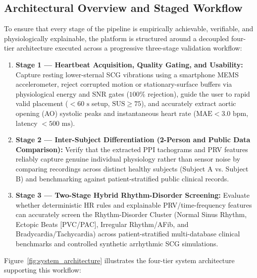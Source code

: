 \subsection{Architectural Overview and Staged Workflow}
To ensure that every stage of the pipeline is empirically achievable, verifiable, and physiologically explainable, the platform is structured around a decoupled four-tier architecture executed across a progressive three-stage validation workflow:
\begin{enumerate}
	\item \textbf{Stage 1 --- Heartbeat Acquisition, Quality Gating, and Usability:} Capture resting lower-sternal SCG vibrations using a smartphone MEMS accelerometer, reject corrupted motion or stationary-surface buffers via physiological energy and SNR gates ($100\%$ rejection), guide the user to rapid valid placement ($< 60\text{ s}$ setup, $\text{SUS} \ge 75$), and accurately extract aortic opening (AO) systolic peaks and instantaneous heart rate ($\text{MAE} < 3.0\text{ bpm}$, latency $< 500\text{ ms}$).
	\item \textbf{Stage 2 --- Inter-Subject Differentiation (2-Person and Public Data Comparison):} Verify that the extracted PPI tachograms and PRV features reliably capture genuine individual physiology rather than sensor noise by comparing recordings across distinct healthy subjects (Subject A vs. Subject B) and benchmarking against patient-stratified public clinical records.
	\item \textbf{Stage 3 --- Two-Stage Hybrid Rhythm-Disorder Screening:} Evaluate whether deterministic HR rules and explainable PRV/time-frequency features can accurately screen the Rhythm-Disorder Cluster (Normal Sinus Rhythm, Ectopic Beats [PVC/PAC], Irregular Rhythm/AFib, and Bradycardia/Tachycardia) across patient-stratified multi-database clinical benchmarks and controlled synthetic arrhythmic SCG simulations.
\end{enumerate}

Figure~\ref{fig:system_architecture} illustrates the four-tier system architecture supporting this workflow:

